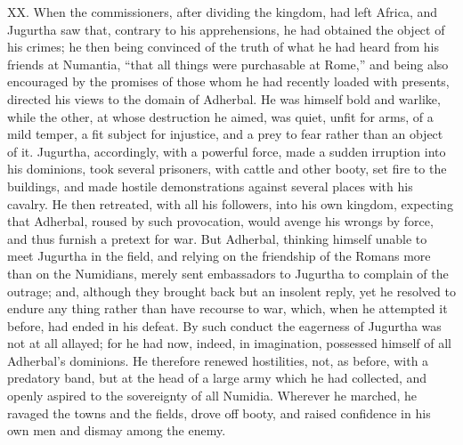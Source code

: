 XX. When the commissioners, after dividing the kingdom, had left
Africa, and Jugurtha saw that, contrary to his apprehensions, he had
obtained the object of his crimes; he then being convinced of the
truth of what he had heard from his friends at Numantia, ``that all
things were purchasable at Rome,'' and being also encouraged by the
promises of those whom he had recently loaded with presents, directed
his views to the domain of Adherbal. He was himself bold and warlike,
while the other, at whose destruction he aimed, was quiet, unfit for
arms, of a mild temper, a fit subject for injustice, and a prey to
fear rather than an object of it. Jugurtha, accordingly, with a
powerful force, made a sudden irruption into his dominions, took
several prisoners, with cattle and other booty, set fire to the
buildings, and made hostile demonstrations against several places with
his cavalry. He then retreated, with all his followers, into his own
kingdom, expecting that Adherbal, roused by such provocation, would
avenge his wrongs by force, and thus furnish a pretext for war. But
Adherbal, thinking himself unable to meet Jugurtha in the field, and
relying on the friendship of the Romans more than on the Numidians,
merely sent embassadors to Jugurtha to complain of the outrage; and,
although they brought back but an insolent reply, yet he resolved to
endure any thing rather than have recourse to war, which, when he
attempted it before, had ended in his defeat. By such conduct the
eagerness of Jugurtha was not at all allayed; for he had now, indeed,
in imagination, possessed himself of all Adherbal's dominions. He
therefore renewed hostilities, not, as before, with a predatory band,
but at the head of a large army which he had collected, and openly
aspired to the sovereignty of all Numidia. Wherever he marched, he
ravaged the towns and the fields, drove off booty, and raised
confidence in his own men and dismay among the enemy.

